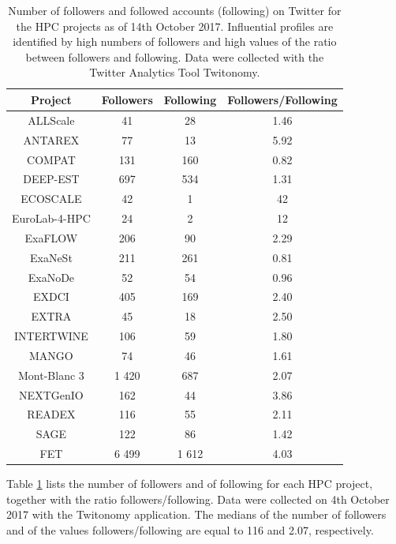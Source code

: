 \begin{table}[t]
 \begin{center}
 {\scriptsize
  \begin{tabular}{cccc}
   \hline 
   \hline
   Project & Followers & Following & Followers/Following \\ 
   \hline
   \hline
   ALLScale & 41 & 28 & 1.46 \\
   ANTAREX & 77 & 13 & 5.92 \\
   COMPAT & 131 & 160 & 0.82 \\
   DEEP-EST & 697 & 534 & 1.31 \\
   ECOSCALE & 42 & 1 & 42 \\
   EuroLab-4-HPC & 24 & 2 & 12 \\
   ExaFLOW & 206 & 90 & 2.29 \\
   ExaNeSt & 211 & 261 & 0.81  \\
   ExaNoDe & 52 & 54 & 0.96 \\
   EXDCI & 405 & 169 & 2.40 \\
   EXTRA & 45 & 18 & 2.50\\
   INTERTWINE & 106 & 59 & 1.80 \\
   MANGO & 74 & 46 & 1.61 \\
   Mont-Blanc 3 & 1 420 & 687 & 2.07 \\
   NEXTGenIO & 162 & 44 & 3.86 \\
   READEX & 116 & 55 & 2.11 \\
   SAGE & 122 & 86 & 1.42 \\ 
   FET & 6 499 & 1 612 & 4.03 \\
   \hline
   \hline
  \end{tabular}
 } 
 \end{center} 
 \caption{Number of followers and followed accounts (following) on Twitter for the HPC projects as of 14th October 2017. Influential profiles are identified by high numbers of followers and high values of the ratio between followers and following. Data were collected with the Twitter Analytics Tool Twitonomy.}
\label{HPC_influence_table} 
\end{table}

Table \ref{HPC_influence_table} lists the number of followers and of following for each HPC project, together with the ratio followers/following. Data were collected on 4th October 2017 with the Twitonomy application. The medians of the number of followers and of the values followers/following are equal to 116 and 2.07, respectively. 

